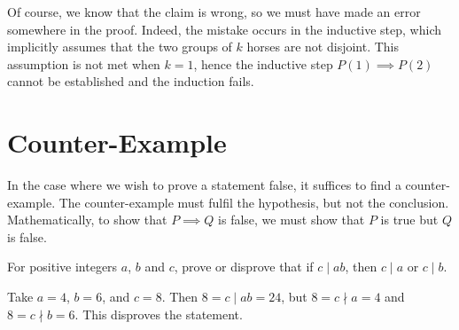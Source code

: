 Of course, we know that the claim is wrong, so we must have made an error somewhere in the proof. Indeed, the mistake occurs in the inductive step, which implicitly assumes that the two groups of $k$ horses are not disjoint. This assumption is not met when $k = 1$, hence the inductive step $P(1) \implies P(2)$ cannot be established and the induction fails.

\section{Counter-Example}

In the case where we wish to prove a statement false, it suffices to find a counter-example. The counter-example must fulfil the hypothesis, but not the conclusion. Mathematically, to show that $P \implies Q$ is false, we must show that $P$ is true but $Q$ is false.

\begin{sample}
    For positive integers $a$, $b$ and $c$, prove or disprove that if $c \mid ab$, then $c \mid a$ or $c \mid b$.
\end{sample}
\begin{sampans}
    Take $a = 4$, $b = 6$, and $c = 8$. Then $8 = c \mid ab = 24$, but $8 = c \nmid a = 4$ and $8 = c \nmid b = 6$. This disproves the statement.
\end{sampans}